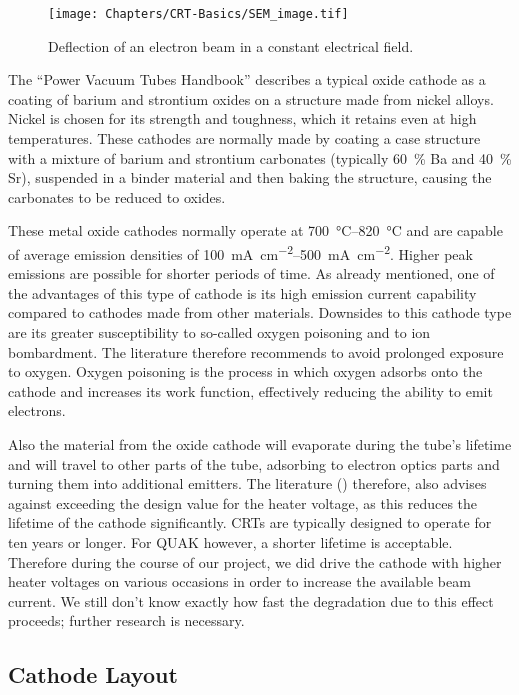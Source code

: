 \begin{figure}
	\centering
	\texttt{[image: Chapters/CRT-Basics/SEM\_image.tif]}
	\caption{Deflection of an electron beam in a constant electrical field.}
	\label{fig:SEM_Cathode}
\end{figure}

The ``Power Vacuum Tubes Handbook'' \cite[chp 3.5.2.1]{Whitaker} describes a typical oxide cathode as a coating of barium and strontium oxides on a structure made from nickel alloys. Nickel is chosen for its strength and toughness, which it retains even at high temperatures. These cathodes are normally made by coating a case structure with a mixture of barium and strontium carbonates (typically \SI{60}{\percent} Ba and \SI{40}{\percent} Sr), suspended in a binder material and then baking the structure, causing the carbonates to be reduced to oxides. 

These metal oxide cathodes normally operate at \SIrange{700}{820}{\celsius} and are capable of average emission densities of \SIrange{100}{500}{\milli\ampere\per\centi\meter\squared}. Higher peak emissions are possible for shorter periods of time. As already mentioned, one of the advantages of this type of cathode is its high emission current capability compared to cathodes made from other materials. Downsides to this cathode type are its greater susceptibility to so-called oxygen poisoning and to ion bombardment. The literature therefore recommends to avoid prolonged exposure to oxygen. Oxygen poisoning is the process in which oxygen adsorbs onto the cathode and increases its work function, effectively reducing the ability to emit electrons. 


Also the material from the oxide cathode will evaporate during the tube's lifetime and will travel to other parts of the tube, adsorbing to electron optics parts and turning them into additional emitters. The literature (\cite[chp 3.5.2.1]{Whitaker}) therefore, also advises against exceeding the design value for the heater voltage, as this reduces the lifetime of the cathode significantly. CRTs are typically designed to operate for ten years or longer. For QUAK however, a shorter lifetime is acceptable. Therefore during the course of our project, we did drive the cathode with higher heater voltages on various occasions in order to increase the available beam current. We still don't know exactly how fast the degradation due to this effect proceeds; further research is necessary.  

\subsection{Cathode Layout}


